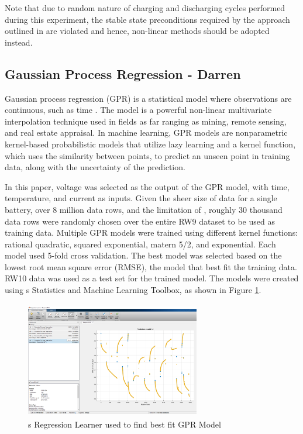 Note that due to random nature of charging and discharging cycles performed during this experiment, the stable state preconditions required by the approach outlined in \cite{5571895} are violated and hence, non-linear methods should be adopted instead.
\subsection{Gaussian Process Regression - Darren}

Gaussian process regression (GPR) is a statistical model where observations are continuous, such as time \cite{10.1371/journal.pone.0163004}.  The model is a powerful non-linear multivariate interpolation technique used in fields as far ranging as mining, remote sensing, and real estate appraisal. In machine learning, GPR models are nonparametric kernel-based probabilistic models that utilize lazy learning and a kernel function, which uses the similarity between points, to predict an unseen point in training data, along with the uncertainty of the prediction.

In this paper, voltage was selected as the output of the GPR model, with time, temperature, and current as inputs.  Given the sheer size of data for a single battery, over 8 million data rows, and the limitation of \MATLAB, roughly 30 thousand data rows were randomly chosen over the entire RW9 dataset to be used as training data.  Multiple GPR models were trained using different kernel functions: rational quadratic, squared exponential, matern 5/2, and exponential.  Each model used 5-fold cross validation.  The best model was selected based on the lowest root mean square error (RMSE), the model that best fit the training data.  RW10 data was used as a test set for the trained model.  The models were created using \MATLAB\textquotesingle s Statistics and Machine Learning Toolbox, as shown in Figure \ref{fig:regresion_learner}.

\begin{figure}
 \includegraphics[height=2in, width=3in]{figures/GPR/regresion_learner}
\caption{\MATLAB\textquotesingle s Regression Learner used to find best fit GPR Model}
\label{fig:regresion_learner}
\end{figure}


